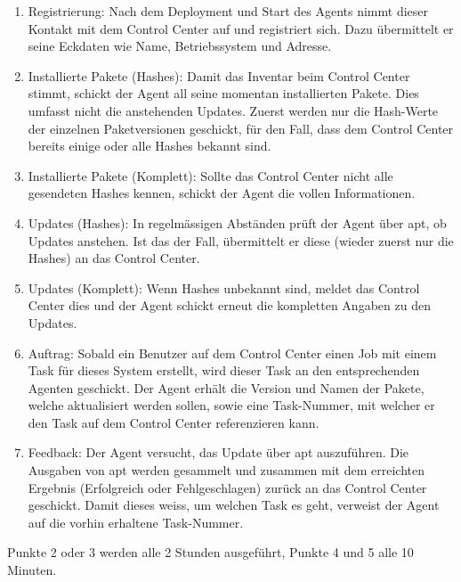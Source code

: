 \begin{enumerate}
    \item Registrierung: Nach dem Deployment und Start des Agents nimmt dieser Kontakt mit dem Control Center auf und registriert sich. Dazu übermittelt er seine Eckdaten wie Name, Betriebssystem und Adresse.
    \item Installierte Pakete (Hashes): Damit das Inventar beim Control Center stimmt, schickt der Agent all seine momentan installierten Pakete. Dies umfasst nicht die anstehenden Updates. Zuerst werden nur die Hash-Werte der einzelnen Paketversionen geschickt, für den Fall, dass dem Control Center bereits einige oder alle Hashes bekannt sind.
    \item Installierte Pakete (Komplett): Sollte das Control Center nicht alle gesendeten Hashes kennen, schickt der Agent die vollen Informationen.
    \item Updates (Hashes): In regelmässigen Abständen prüft der Agent über \gls{apt}, ob Updates anstehen. Ist das der Fall, übermittelt er diese (wieder zuerst nur die Hashes) an das Control Center.
    \item Updates (Komplett): Wenn Hashes unbekannt sind, meldet das Control Center dies und der Agent schickt erneut die kompletten Angaben zu den Updates.
    \item Auftrag: Sobald ein Benutzer auf dem Control Center einen Job mit einem Task für dieses System erstellt, wird dieser Task an den entsprechenden Agenten geschickt. Der Agent erhält die Version und Namen der Pakete, welche aktualisiert werden sollen, sowie eine Task-Nummer, mit welcher er den Task auf dem Control Center referenzieren kann.
    \item Feedback: Der Agent versucht, das Update über \gls{apt} auszuführen. Die Ausgaben von apt werden gesammelt und zusammen mit dem erreichten Ergebnis (Erfolgreich oder Fehlgeschlagen) zurück an das Control Center geschickt. Damit dieses weiss, um welchen Task es geht, verweist der Agent auf die vorhin erhaltene Task-Nummer.
\end{enumerate}

Punkte 2 oder 3 werden alle 2 Stunden ausgeführt, Punkte 4 und 5 alle 10 Minuten.